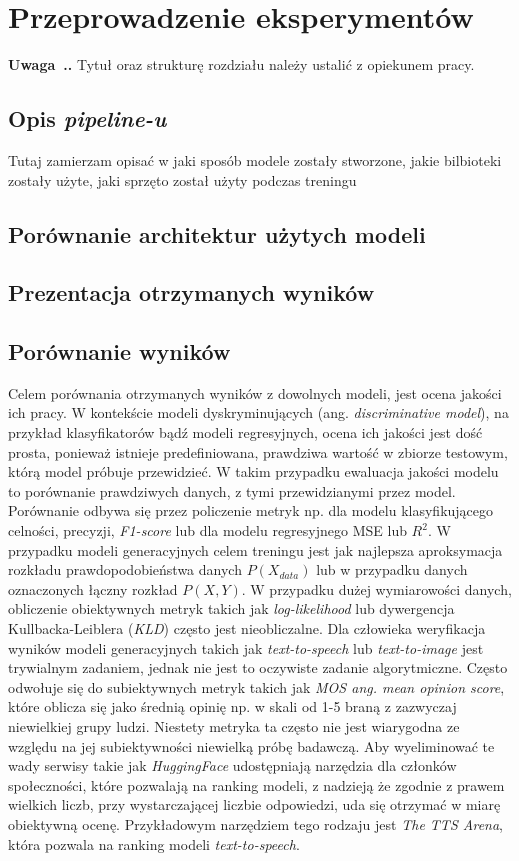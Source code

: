\documentclass[data-science]{agh-wi} %
\newcounter{comment}[chapter]
\newenvironment{comment}[1][]{\begin{shaded}\refstepcounter{comment}
\noindent \textbf{Uwaga~\thechapter.\thecomment. #1} \rmfamily}{\end{shaded}}
\begin{document}
\chapter{Przeprowadzenie eksperymentów}
\begin{comment}
Tytuł oraz strukturę rozdziału należy ustalić z opiekunem pracy.
\end{comment}
\section{Opis \textit{pipeline-u}}
Tutaj zamierzam opisać w jaki sposób modele zostały stworzone, jakie bilbioteki zostały użyte, jaki sprzęto został użyty podczas treningu
\section{Porównanie architektur użytych modeli}
\section{Prezentacja otrzymanych wyników}
\section{Porównanie wyników}
Celem porównania otrzymanych wyników z dowolnych modeli, jest ocena jakości ich pracy. W kontekście modeli dyskryminujących (ang. \textit{discriminative model}), na przykład klasyfikatorów bądź modeli regresyjnych, ocena ich jakości jest dość prosta, ponieważ istnieje predefiniowana, prawdziwa wartość w zbiorze testowym, którą model próbuje przewidzieć. W takim przypadku ewaluacja jakości modelu to porównanie prawdziwych danych, z tymi przewidzianymi przez model. Porównanie odbywa się przez policzenie metryk np. dla modelu klasyfikującego celności, precyzji, \textit{F1-score} lub dla modelu regresyjnego MSE lub $R^2$. W przypadku modeli generacyjnych celem treningu jest jak najlepsza aproksymacja rozkładu prawdopodobieństwa danych $P(X_{data})$ lub w przypadku danych oznaczonych łączny rozkład $P(X, Y)$. W przypadku dużej wymiarowości danych, obliczenie obiektywnych metryk takich jak \textit{log-likelihood} lub dywergencja Kullbacka-Leiblera (\textit{KLD}) często jest nieobliczalne. Dla człowieka weryfikacja wyników modeli generacyjnych takich jak \textit{text-to-speech} lub \textit{text-to-image} jest trywialnym zadaniem, jednak nie jest to oczywiste zadanie algorytmiczne. Często odwołuje się do subiektywnych metryk takich jak \textit{MOS ang. mean opinion score}, które oblicza się jako średnią opinię np. w skali od 1-5 braną z zazwyczaj niewielkiej grupy ludzi. Niestety metryka ta często nie jest wiarygodna ze względu na jej subiektywności niewielką próbę badawczą. Aby wyeliminować te wady serwisy takie jak \textit{HuggingFace} udostępniają narzędzia dla członków społeczności, które pozwalają na ranking modeli, z nadzieją że zgodnie z prawem wielkich liczb, przy wystarczającej liczbie odpowiedzi, uda się otrzymać w miarę obiektywną ocenę. Przykładowym narzędziem tego rodzaju jest \textit{The TTS Arena}\cite{tts_arena}, która pozwala na ranking modeli \textit{text-to-speech}.
\end{document}
